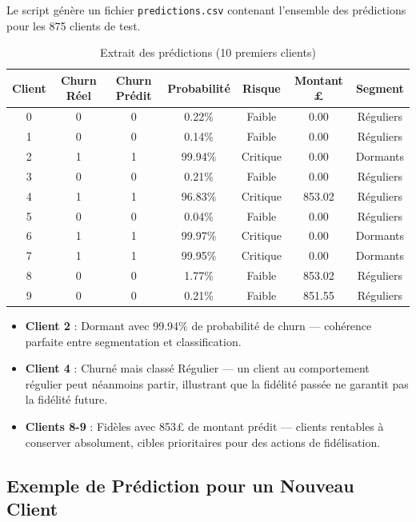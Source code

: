 \documentclass[11pt,a4paper]{article}
\begin{document}
Le script génère un fichier \texttt{predictions.csv} contenant l'ensemble des prédictions pour les 875 clients de test.

\begin{table}[H]
	\centering
	\small
	\caption{Extrait des prédictions (10 premiers clients)}
	\label{tab:predictions_extract}
	\begin{tabular}{|c|c|c|c|c|c|c|}
		\hline
		\textbf{Client} & \textbf{Churn Réel} & \textbf{Churn Prédit} & \textbf{Probabilité} & \textbf{Risque} & \textbf{Montant £} & \textbf{Segment} \\
		\hline
		0 & 0 & 0 & 0.22\% & Faible & 0.00 & Réguliers \\
		1 & 0 & 0 & 0.14\% & Faible & 0.00 & Réguliers \\
		2 & 1 & 1 & 99.94\% & Critique & 0.00 & Dormants \\
		3 & 0 & 0 & 0.21\% & Faible & 0.00 & Réguliers \\
		4 & 1 & 1 & 96.83\% & Critique & 853.02 & Réguliers \\
		5 & 0 & 0 & 0.04\% & Faible & 0.00 & Réguliers \\
		6 & 1 & 1 & 99.97\% & Critique & 0.00 & Dormants \\
		7 & 1 & 1 & 99.95\% & Critique & 0.00 & Dormants \\
		8 & 0 & 0 & 1.77\% & Faible & 853.02 & Réguliers \\
		9 & 0 & 0 & 0.21\% & Faible & 851.55 & Réguliers \\
		\hline
		\end{tabular}
	\end{table}
\begin{tcolorbox}[colback=backcolour, colframe=headerblue, title=\textbf{Observations sur l'extrait}]
	\begin{itemize}
		\item \textbf{Client 2} : Dormant avec 99.94\% de probabilité de churn — cohérence parfaite entre segmentation et classification.
		\item \textbf{Client 4} : Churné mais classé Régulier — un client au comportement régulier peut néanmoins partir, illustrant que la fidélité passée ne garantit pas la fidélité future.
		\item \textbf{Clients 8-9} : Fidèles avec 853£ de montant prédit — clients rentables à conserver absolument, cibles prioritaires pour des actions de fidélisation.
	\end{itemize}
\end{tcolorbox}
\subsection{Exemple de Prédiction pour un Nouveau Client}
\end{document}
